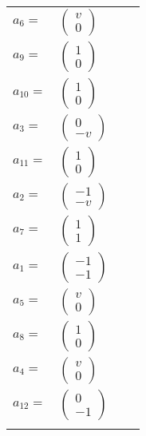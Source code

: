 \documentclass[1p]{elsarticle_modified}
\theoremstyle{definition}
\begin{document}
\begin{tabular}{m{7pt} m{180pt} m{7pt} m{180pt} }
\flushright $a_{6}=$&$\begin{pmatrix}v\\0\end{pmatrix}$ \\
\flushright $a_{9}=$&$\begin{pmatrix}1\\0\end{pmatrix}$ \\
\flushright $a_{10}=$&$\begin{pmatrix}1\\0\end{pmatrix}$ \\
\flushright $a_{3}=$&$\begin{pmatrix}0\\- v\end{pmatrix}$ \\
\flushright $a_{11}=$&$\begin{pmatrix}1\\0\end{pmatrix}$ \\
\flushright $a_{2}=$&$\begin{pmatrix}-1\\- v\end{pmatrix}$ \\
\flushright $a_{7}=$&$\begin{pmatrix}1\\1\end{pmatrix}$ \\
\flushright $a_{1}=$&$\begin{pmatrix}-1\\-1\end{pmatrix}$ \\
\flushright $a_{5}=$&$\begin{pmatrix}v\\0\end{pmatrix}$ \\
\flushright $a_{8}=$&$\begin{pmatrix}1\\0\end{pmatrix}$ \\
\flushright $a_{4}=$&$\begin{pmatrix}v\\0\end{pmatrix}$ \\
\flushright $a_{12}=$&$\begin{pmatrix}0\\-1\end{pmatrix}$\\&\end{tabular}
\end{document}
